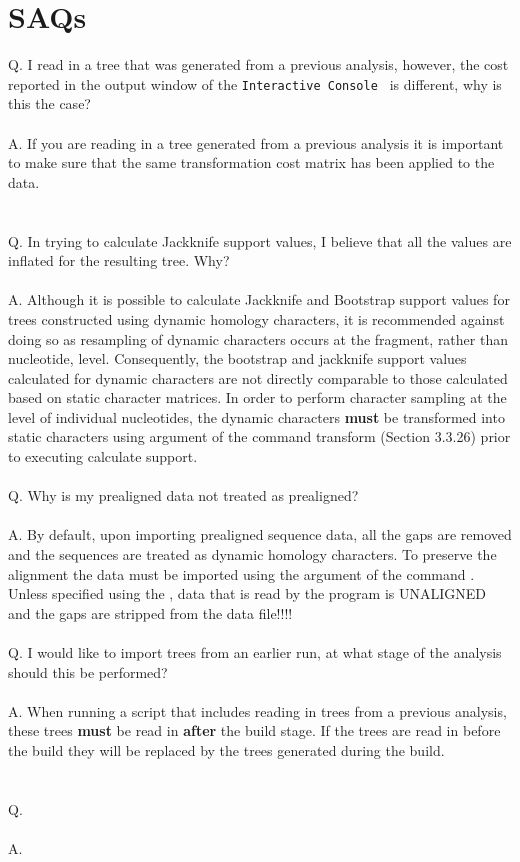\section{SAQs}
Q. I read in a tree that was generated from a previous analysis, however, the cost reported in the output window
of the \texttt {Interactive Console } is different, why is this the case?\\
\\
A. If you are reading in a tree generated from a previous analysis it is important to make sure that the same 
transformation cost matrix has been applied to the data.\\
\\
\\
Q. In trying to calculate Jackknife support values, I believe that all the values are inflated for the resulting tree.
Why?\\
\\
A. Although it is possible to calculate Jackknife and Bootstrap support values for trees constructed using dynamic 
homology characters, it is recommended against doing so as resampling of dynamic characters occurs at the fragment, 
rather than nucleotide, level. Consequently, the bootstrap and jackknife support values calculated for dynamic 
characters are not directly comparable to those calculated based on static character matrices. In order to perform 
character sampling at the level of individual nucleotides, the dynamic characters {\bf must} be transformed into 
static characters using  argument of the command transform (Section 3.3.26) prior 
to executing calculate support.\\
\\
Q. Why is my prealigned data not treated as prealigned?\\
\\
A.  By default, upon importing prealigned sequence data, all the gaps are removed and the sequences are 
treated as dynamic homology characters. To preserve the alignment the data must be imported using the
 argument of the command .  Unless specified using the 
, data that is read by the program is UNALIGNED and the gaps are stripped 
from the data file!!!!\\
\\
Q. I would like to import trees from an earlier run, at what stage of the analysis should this be performed?\\
\\
A. When running a script that includes reading in trees from a previous analysis, these trees {\bf must} be read 
in {\bf after} the build stage.  If the trees are read in before the build they will be replaced by the trees 
generated during the build.\\
\\
\\
Q.\\
\\
A.\\
\\
